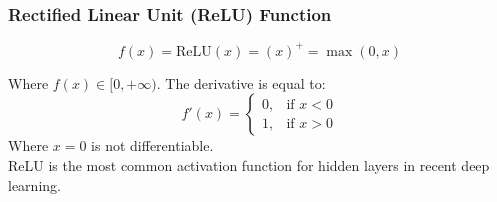 \documentclass[aspectratio=169, 10pt]{beamer}
\begin{document}
\begin{frame}
    \frametitle{Rectified Linear Unit (ReLU) Function}
    \small
    \begin{figure}
        \centering
    \end{figure}

    \[
        f(x) = \text{ReLU}(x) = (x)^+ = \max(0, x)
    \]

    Where $f(x) \in [ 0, +\infty )$. The derivative is equal to:
    \[
        f'(x) = \begin{cases}
            0,& \text{if } x < 0 \\
            1,& \text{if } x > 0
        \end{cases}
    \]
    Where $x = 0$ is not differentiable.\\
    ReLU is the most common activation function for hidden layers in recent deep learning.

\end{frame}
\end{document}
